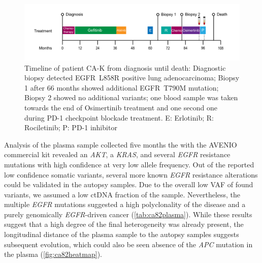 \begin{figure}[ht]
\centering
\includegraphics[width=.99\linewidth]{Figures/CASCADE/CA82/CA-K_timeline}
\caption[Timeline of patient CA-K from diagnosis until death]{Timeline of patient CA-K from diagnosis until death: Diagnostic biopsy detected EGFR~L858R positive lung adenocarcinoma;  Biopsy 1 after 66 months showed additional EGFR~T790M mutation; Biopsy 2 showed no additional variants; one blood sample was taken towards the end of Osimertinib treatment and one second one during PD-1 checkpoint blockade treatment. E: Erlotinib; R: Rociletinib; P: PD-1 inhibitor} \label{fig:ca82timeline}
\end{figure}

Analysis of the plasma sample collected five  months  the  with the AVENIO commercial kit revealed an \textit{AKT}, a \textit{KRAS}, and several \textit{EGFR} resistance mutations with high confidence at very low allele frequency. Out of the reported low confidence somatic variants, several more known \textit{EGFR} resistance alterations could be validated in the autopsy samples. Due to the overall low VAF of found variants, we assumed a low ctDNA fraction of the sample. Nevertheless,  the multiple \textit{EGFR} mutations suggested a high polyclonality of the disease and a purely genomically \textit{EGFR}-driven cancer  (\autoref{tab:ca82plasma}). While these results suggest that a high degree of the final heterogeneity was already present, the longitudinal distance of the plasma sample to the autopsy samples suggests subsequent evolution, which could also be seen  absence of the \textit{APC} mutation in the plasma (\autoref{fig:ca82heatmap}).

